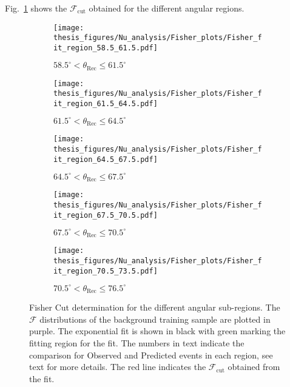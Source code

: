 Fig.~\ref{fig:Fisher_cut} shows the $\mathcal{F}_{\text{cut}}$ obtained for the different angular regions. 
\FloatBarrier
\begin{figure}[h!]
  \centering
   \begin{subfigure}[l]{.48\textwidth}
     \centering
     \texttt{[image: thesis\_figures/Nu\_analysis/Fisher\_plots/Fisher\_fit\_region\_58.5\_61.5.pdf]}
     \caption{$ 58.5^{\circ} <\theta_{\text{Rec}} \leq 61.5^{\circ}$}
   \end{subfigure}
   \begin{subfigure}[r]{.48\textwidth}
     \centering
     \texttt{[image: thesis\_figures/Nu\_analysis/Fisher\_plots/Fisher\_fit\_region\_61.5\_64.5.pdf]}
     \caption{$ 61.5^{\circ} <\theta_{\text{Rec}} \leq 64.5^{\circ}$}
    \end{subfigure}
    \hfill
    \begin{subfigure}[l]{.48\textwidth}
      \centering
      \texttt{[image: thesis\_figures/Nu\_analysis/Fisher\_plots/Fisher\_fit\_region\_64.5\_67.5.pdf]}
      \caption{$ 64.5^{\circ} <\theta_{\text{Rec}} \leq 67.5^{\circ}$}
    \end{subfigure}

    \begin{subfigure}[r]{.48\textwidth}
      \centering
      \texttt{[image: thesis\_figures/Nu\_analysis/Fisher\_plots/Fisher\_fit\_region\_67.5\_70.5.pdf]}
      \caption{$ 67.5^{\circ} <\theta_{\text{Rec}} \leq 70.5^{\circ}$}
    \end{subfigure}
    \hfill    
    \begin{subfigure}[r]{.48\textwidth}
      \centering
      \texttt{[image: thesis\_figures/Nu\_analysis/Fisher\_plots/Fisher\_fit\_region\_70.5\_73.5.pdf]}
      \caption{$ 70.5^{\circ} <\theta_{\text{Rec}} \leq 76.5^{\circ}$}
   \end{subfigure}
   \caption{Fisher Cut determination for the different angular sub-regions. The $\mathcal{F}$ distributions of the background training sample are plotted in purple. The exponential fit is shown in black with green marking the fitting region for the fit. The numbers in text indicate the comparison for Observed and Predicted events in each region, see text for more details. The red line indicates the $\mathcal{F}_{\text{cut}}$ obtained from the fit.}
    \label{fig:Fisher_cut}

\end{figure}

